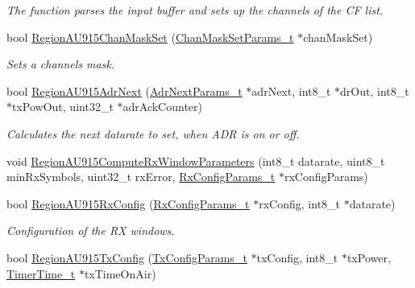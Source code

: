 \begin{DoxyCompactItemize}
\begin{DoxyCompactList}\small\item\em The function parses the input buffer and sets up the channels of the CF list. \end{DoxyCompactList}\item 
bool \mbox{\hyperlink{group___r_e_g_i_o_n_a_u915_gaa3219b953ef291e813856e391ec6f494}{Region\+A\+U915\+Chan\+Mask\+Set}} (\mbox{\hyperlink{group___r_e_g_i_o_n_ga6d24f7da136006410827dfb29f6b9b9e}{Chan\+Mask\+Set\+Params\+\_\+t}} $\ast$chan\+Mask\+Set)
\begin{DoxyCompactList}\small\item\em Sets a channels mask. \end{DoxyCompactList}\item 
bool \mbox{\hyperlink{group___r_e_g_i_o_n_a_u915_ga1a95e39e41556d5660b62cc8e3ac375f}{Region\+A\+U915\+Adr\+Next}} (\mbox{\hyperlink{group___r_e_g_i_o_n_ga567c2742622326b350b4e91bbf61b4ce}{Adr\+Next\+Params\+\_\+t}} $\ast$adr\+Next, int8\+\_\+t $\ast$dr\+Out, int8\+\_\+t $\ast$tx\+Pow\+Out, uint32\+\_\+t $\ast$adr\+Ack\+Counter)
\begin{DoxyCompactList}\small\item\em Calculates the next datarate to set, when A\+DR is on or off. \end{DoxyCompactList}\item 
void \mbox{\hyperlink{group___r_e_g_i_o_n_a_u915_ga2f0f526d4c703e4f2058990b5cf92563}{Region\+A\+U915\+Compute\+Rx\+Window\+Parameters}} (int8\+\_\+t datarate, uint8\+\_\+t min\+Rx\+Symbols, uint32\+\_\+t rx\+Error, \mbox{\hyperlink{group___r_e_g_i_o_n_ga375c038078dfcfc7ef14280021db719e}{Rx\+Config\+Params\+\_\+t}} $\ast$rx\+Config\+Params)
\item 
bool \mbox{\hyperlink{group___r_e_g_i_o_n_a_u915_gaf80c46b490d80c77aa137a5abe70c073}{Region\+A\+U915\+Rx\+Config}} (\mbox{\hyperlink{group___r_e_g_i_o_n_ga375c038078dfcfc7ef14280021db719e}{Rx\+Config\+Params\+\_\+t}} $\ast$rx\+Config, int8\+\_\+t $\ast$datarate)
\begin{DoxyCompactList}\small\item\em Configuration of the RX windows. \end{DoxyCompactList}\item 
bool \mbox{\hyperlink{group___r_e_g_i_o_n_a_u915_ga6016e24d99216fad47de5194957c2c01}{Region\+A\+U915\+Tx\+Config}} (\mbox{\hyperlink{group___r_e_g_i_o_n_gabed730d4d04b0b60d4b6d1966d3f21d3}{Tx\+Config\+Params\+\_\+t}} $\ast$tx\+Config, int8\+\_\+t $\ast$tx\+Power, \mbox{\hyperlink{utilities_8h_a4215ca43d3e953099ea758ce428599d0}{Timer\+Time\+\_\+t}} $\ast$tx\+Time\+On\+Air)

\end{DoxyCompactItemize}

